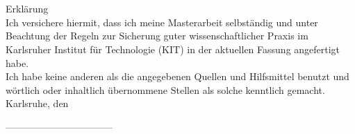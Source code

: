 \chapter*{}
\begin{flushleft}
\vspace{10cm}
Erklärung\\[1cm]
Ich versichere hiermit, dass ich meine Masterarbeit selbständig und unter Beachtung der Regeln zur Sicherung guter wissenschaftlicher Praxis im Karlsruher Institut für Technologie (KIT) in der aktuellen Fassung angefertigt habe. \\
Ich habe keine anderen als die angegebenen Quellen und Hilfsmittel benutzt und wörtlich oder inhaltlich übernommene Stellen als solche kenntlich gemacht.\\[1cm]

Karlsruhe, den \abgabede\\[1cm]
\end{flushleft}

\begin{center}
---------------------------------\\
\diplomand
\end{center}
